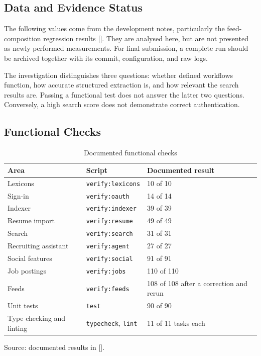 \documentclass[11pt,a4paper]{article}
\newcommand{\code}[1]{\texttt{#1}}
\newcommand{\reflink}[1]{\hyperlink{ref:#1}{#1}}
\newcommand{\refsep}{}
\newcommand{\refs}[1]{\begingroup
  \gdef\refsep{}%
  \renewcommand*{\do}[1]{\refsep\reflink{##1}\gdef\refsep{, }}%
  [\docsvlist{#1}]\endgroup}
\begin{document}
\subsection{Data and Evidence Status}

The following values come from the development notes, particularly the feed-composition regression results \refs{P10}. They are analysed here, but are not presented as newly performed measurements. For final submission, a complete run should be archived together with its commit, configuration, and raw logs.

The investigation distinguishes three questions: whether defined workflows function, how accurate structured extraction is, and how relevant the search results are. Passing a functional test does not answer the latter two questions. Conversely, a high search score does not demonstrate correct authentication.

\subsection{Functional Checks}

\begin{table}[htbp]
\centering
\caption{Documented functional checks}
\label{tab:checks}
\begin{tabularx}{\textwidth}{@{}>{\raggedright\arraybackslash}p{}>{\raggedright\arraybackslash}p{}Y@{}}
\toprule
\textbf{Area} & \textbf{Script} & \textbf{Documented result} \\
\midrule
Lexicons & \code{verify:lexicons} & 10 of 10 \\
Sign-in & \code{verify:oauth} & 14 of 14 \\
Indexer & \code{verify:indexer} & 39 of 39 \\
Resume import & \code{verify:resume} & 49 of 49 \\
Search & \code{verify:search} & 31 of 31 \\
Recruiting assistant & \code{verify:agent} & 27 of 27 \\
Social features & \code{verify:social} & 91 of 91 \\
Job postings & \code{verify:jobs} & 110 of 110 \\
Feeds & \code{verify:feeds} & 108 of 108 after a correction and rerun \\
Unit tests & \code{test} & 90 of 90 \\
Type checking and linting & \code{typecheck}, \code{lint} & 11 of 11 tasks each \\
\bottomrule
\end{tabularx}
\par\smallskip\raggedright\footnotesize Source: documented results in \refs{P10}.
\end{table}
\end{document}
